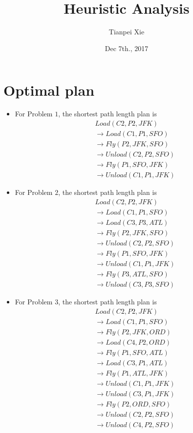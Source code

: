\documentclass[11pt]{article}
\begin{document}
\title{Heuristic Analysis}
\author{ Tianpei Xie}
\date{ Dec 7th., 2017 }
\maketitle
\section{Optimal plan}
\begin{itemize}
\item For Problem $1$, the shortest path length plan is 
\begin{align*}
&Load(C2, P2, JFK) \\
  &\rightarrow Load(C1, P1, SFO)\\
 & \rightarrow Fly(P2, JFK, SFO) \\
  &\rightarrow Unload(C2, P2, SFO)\\
  &\rightarrow Fly(P1, SFO, JFK)\\
 &\rightarrow  Unload(C1, P1, JFK)
\end{align*}

\item For Problem $2$, the shortest path length plan is 
\begin{align*}
&Load(C2, P2, JFK)\\
&\rightarrow  Load(C1, P1, SFO)\\
&\rightarrow Load(C3, P3, ATL)\\
&\rightarrow Fly(P2, JFK, SFO)\\
&\rightarrow Unload(C2, P2, SFO)\\
&\rightarrow Fly(P1, SFO, JFK)\\
&\rightarrow Unload(C1, P1, JFK)\\
&\rightarrow Fly(P3, ATL, SFO)\\
&\rightarrow Unload(C3, P3, SFO)
\end{align*}

\item For Problem $3$, the shortest path length plan is
\begin{align*}
&Load(C2, P2, JFK)\\
&\rightarrow  Load(C1, P1, SFO)\\
&\rightarrow  Fly(P2, JFK, ORD)\\
&\rightarrow  Load(C4, P2, ORD)\\
&\rightarrow Fly(P1, SFO, ATL)\\
&\rightarrow Load(C3, P1, ATL)\\
&\rightarrow  Fly(P1, ATL, JFK)\\
&\rightarrow  Unload(C1, P1, JFK)\\
&\rightarrow  Unload(C3, P1, JFK)\\
&\rightarrow  Fly(P2, ORD, SFO)\\
&\rightarrow Unload(C2, P2, SFO)\\
&\rightarrow Unload(C4, P2, SFO)
\end{align*}
\end{itemize}
\end{document}
